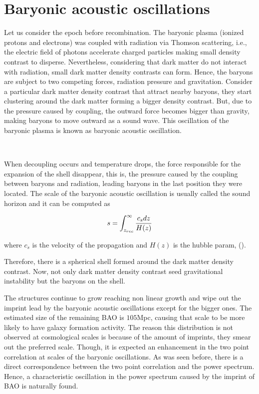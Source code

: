 \section{ Baryonic acoustic oscillations }
Let us consider the epoch before recombination. The baryonic plasma (ionized protons and electrons) was coupled with radiation via 
Thomson scattering,  i.e., the electric field of photons accelerate charged particles making small density contrast to disperse. Nevertheless,
considering that dark matter do not interact with radiation, small dark matter density contrasts can form. Hence, the baryons are 
subject to two competing forces, radiation pressure and gravitation. Consider a particular dark matter density contrast that attract
nearby baryons, they start clustering around the dark matter forming a bigger density contrast. But, due to the pressure caused
by coupling, the outward force becomes bigger than gravity, making baryons to move outward as a sound wave. This oscillation 
of the baryonic plasma is known as baryonic acoustic oscillation. 

\

When decoupling occurs and temperature drops, the force responsible for the expansion of the shell disappear, this is, 
the pressure caused by the coupling between baryons and radiation, leading baryons in the last position they were located. 
The scale of the baryonic acoustic oscillation is 
usually called the sound horizon and it can be computed as

\[  
s = \int_{z_{rec}}^{\infty} \frac{c_s dz}{H(z)}
\]


where $c_s$ is the velocity of the propagation and $H(z)$ is the hubble param, (\cite{pilar}). 

Therefore, there is a spherical shell formed 
around the dark matter density contrast. Now, not only dark matter density contrast seed gravitational instability but 
the baryons on the shell. 

The structures continue to grow reaching non linear growth and wipe out the imprint lead by the baryonic acoustic
oscillations except for the bigger ones. The estimated size of the remaining BAO is $105$Mpc, causing that scale to 
be more likely to have galaxy formation activity. The reason this distribution is not observed at cosmological scales is because
of the amount of imprints, they smear out the preferred scale. Though, it is expected an enhancement in the two point
correlation at scales of the baryonic oscillations. As was seen before, there is a direct correspondence between the 
two point correlation and the power spectrum. Hence, a characteristic oscillation in the power spectrum caused by the imprint of BAO is naturally found. 	


